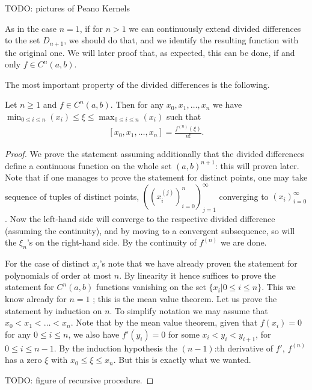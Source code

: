TODO: pictures of Peano Kernels

As in the case $n = 1$, if for $n > 1$ we can continuously extend divided differences to the set $D_{n + 1}$, we should do that, and we identify the resulting function with the original one. We will later proof that, as expected, this can be done, if and only $f \in C^{n}(a, b)$.

The most important property of the divided differences is the following.

\begin{lause}
	Let $n \geq 1$ and $f \in C^{n}(a, b)$. Then for any $x_{0}, x_{1}, \ldots, x_{n}$ we have $\min_{0 \leq i \leq n}(x_{i}) \leq \xi \leq \max_{0 \leq i \leq n}(x_{i})$ such that
	\begin{align}\label{mean_value}
		[x_{0}, x_{1}, \ldots, x_{n}] = \frac{f^{(n)}(\xi)}{n!}.
	\end{align}
\end{lause}
\begin{proof}
	We prove the statement assuming additionally that the divided differences define a continuous function on the whole set $(a, b)^{n + 1}$: this will proven later. Note that if one manages to prove the statement for distinct points, one may take sequence of tuples of distinct points, $((x_{i}^{(j)})_{i = 0}^{n})_{j = 1}^{\infty}$ converging to $(x_{i})_{i = 0}^{\infty}$. Now the left-hand side will converge to the respective divided difference (assuming the continuity), and by moving to a convergent subsequence, so will the $\xi_{n}$'s on the right-hand side. By the continuity of $f^{(n)}$ we are done.

	For the case of distinct $x_{i}$'s note that we have already proven the statement for polynomials of order at most $n$. By linearity it hence suffices to prove the statement for $C^{n}(a, b)$ functions vanishing on the set $\{x_{i} | 0 \leq i \leq n\}$. This we know already for $n = 1$ ; this is the mean value theorem. Let us prove the statement by induction on $n$. To simplify notation we may assume that $x_{0} < x_{1} < \ldots < x_{n}$. Note that by the mean value theorem, given that $f(x_{i}) = 0$ for any $0 \leq i \leq n$, we also have $f'(y_{i}) = 0$ for some $x_{i} < y_{i} < y_{i + 1}$, for $0 \leq i \leq n - 1$. By the induction hypothesis the $(n - 1)$:th derivative of $f'$, $f^{(n)}$ has a zero $\xi$ with $x_{0} \leq \xi \leq x_{n}$. But this is exactly what we wanted.

	TODO: figure of recursive procedure.
\end{proof}

